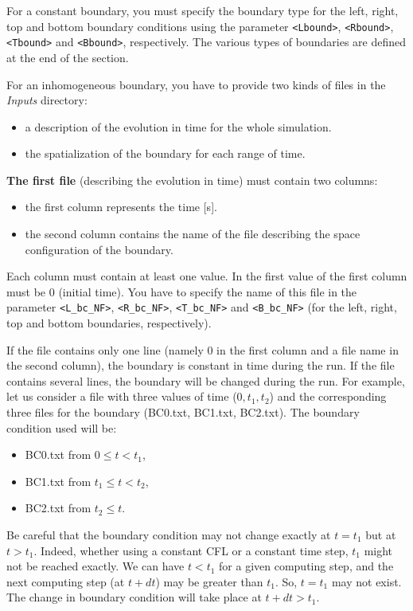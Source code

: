 \documentclass[a4paper, 11pt]{article}
\begin{document}
For a constant boundary, you must specify the boundary type for the left, right, top and bottom boundary conditions using the parameter \texttt{<Lbound>},
\texttt{<Rbound>}, \texttt{<Tbound>} and \texttt{<Bbound>}, respectively. The various types of boundaries are defined at the end of the section.

For an inhomogeneous boundary, you have to provide two kinds of files in the \textit{Inputs} directory:
\begin{itemize}
\item a description of the evolution in time for the whole simulation.
\item the spatialization of the boundary for each range of time.
\end{itemize}

\noindent \textbf{The first file} (describing the evolution in time) must contain two columns:
\begin{itemize}
\item the first column represents the time [s].
\item the second column contains the name of the file describing the space configuration of the boundary.
\end{itemize}
Each column must contain at least one value.
In the first value of the first column must be 0 (initial time).
You have to specify the name of this file in the parameter \texttt{<L\_bc\_NF>}, \texttt{<R\_bc\_NF>}, \texttt{<T\_bc\_NF>} and \texttt{<B\_bc\_NF>} (for the left, right, top and bottom boundaries, respectively).

If the file contains only one line (namely 0 in the first column and a file name in the second column), the boundary is constant in time during the run.
If the file contains several lines, the boundary will be changed during the run.
For example, let us consider a file with three values of time ($0, t_1, t_2$) and the corresponding three files for the boundary (BC0.txt, BC1.txt, BC2.txt).
The boundary condition used will be:
\begin{itemize}
\item BC0.txt from $0 \leq t < t_1$,
\item BC1.txt from $t_1 \leq t < t_2$,
\item BC2.txt from  $t_2 \leq t$. 
\end{itemize}
Be careful that the boundary condition may not change exactly at $t=t_1$ but at $t > t_1$.
Indeed, whether using a constant CFL or a constant time step, $t_1$ might not be reached exactly.
We can have $t<t_1$ for a given computing step, and the next computing step (at $t+dt$) may be greater than $t_1$. So, $t=t_1$ may not exist.
The change in boundary condition will take place at $t+dt>t_1$.
\end{document}
